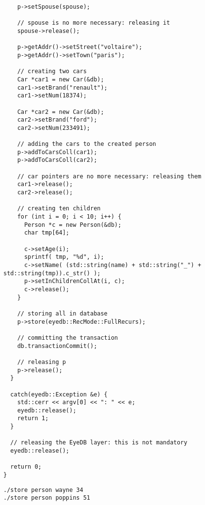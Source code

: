 \begin{verbatim}
    p->setSpouse(spouse);

    // spouse is no more necessary: releasing it
    spouse->release();

    p->getAddr()->setStreet("voltaire");
    p->getAddr()->setTown("paris");

    // creating two cars
    Car *car1 = new Car(&db);
    car1->setBrand("renault");
    car1->setNum(18374);

    Car *car2 = new Car(&db);
    car2->setBrand("ford");
    car2->setNum(233491);

    // adding the cars to the created person
    p->addToCarsColl(car1);
    p->addToCarsColl(car2);

    // car pointers are no more necessary: releasing them
    car1->release();
    car2->release();

    // creating ten children
    for (int i = 0; i < 10; i++) {
      Person *c = new Person(&db);
      char tmp[64];

      c->setAge(i);
      sprintf( tmp, "%d", i);
      c->setName( (std::string(name) + std::string("_") + std::string(tmp)).c_str() );
      p->setInChildrenCollAt(i, c);
      c->release();
    }

    // storing all in database
    p->store(eyedb::RecMode::FullRecurs);

    // committing the transaction
    db.transactionCommit();

    // releasing p
    p->release();
  }

  catch(eyedb::Exception &e) {
    std::cerr << argv[0] << ": " << e;
    eyedb::release();
    return 1;
  }

  // releasing the EyeDB layer: this is not mandatory
  eyedb::release();

  return 0;
}
\end{verbatim}
\begin{verbatim}
./store person wayne 34
./store person poppins 51
\end{verbatim}
\normalsize

